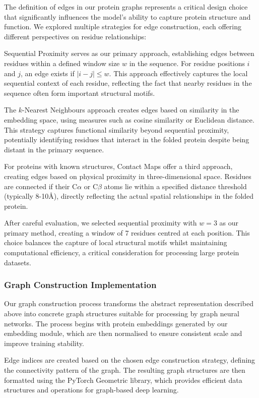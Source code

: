 \documentclass[12pt,a4paper]{article}
\begin{document}
The definition of edges in our protein graphs represents a critical design choice that significantly influences the model's ability to capture protein structure and function. We explored multiple strategies for edge construction, each offering different perspectives on residue relationships:

Sequential Proximity serves as our primary approach, establishing edges between residues within a defined window size $w$ in the sequence. For residue positions $i$ and $j$, an edge exists if $|i - j| \leq w$. This approach effectively captures the local sequential context of each residue, reflecting the fact that nearby residues in the sequence often form important structural motifs.

The $k$-Nearest Neighbours approach creates edges based on similarity in the embedding space, using measures such as cosine similarity or Euclidean distance. This strategy captures functional similarity beyond sequential proximity, potentially identifying residues that interact in the folded protein despite being distant in the primary sequence.

For proteins with known structures, Contact Maps offer a third approach, creating edges based on physical proximity in three-dimensional space. Residues are connected if their C$\alpha$ or C$\beta$ atoms lie within a specified distance threshold (typically 8-10Å), directly reflecting the actual spatial relationships in the folded protein.

After careful evaluation, we selected sequential proximity with $w = 3$ as our primary method, creating a window of 7 residues centred at each position. This choice balances the capture of local structural motifs whilst maintaining computational efficiency, a critical consideration for processing large protein datasets.

\subsubsection{Graph Construction Implementation}

Our graph construction process transforms the abstract representation described above into concrete graph structures suitable for processing by graph neural networks. The process begins with protein embeddings generated by our embedding module, which are then normalised to ensure consistent scale and improve training stability.

Edge indices are created based on the chosen edge construction strategy, defining the connectivity pattern of the graph. The resulting graph structures are then formatted using the PyTorch Geometric library, which provides efficient data structures and operations for graph-based deep learning.
\end{document}
